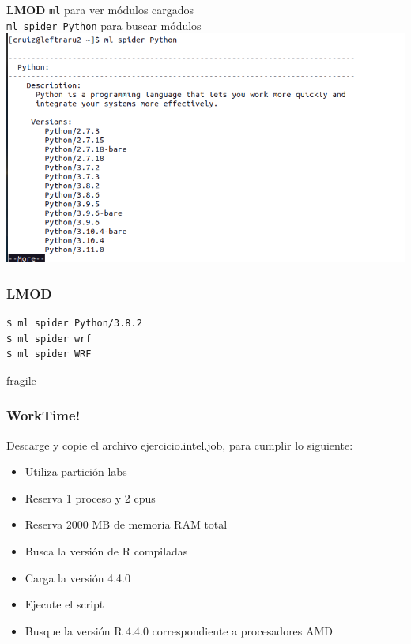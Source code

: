 \documentclass[aspectratio=169,professionalfonts]{beamer}
\begin{document}
\begin{frame}{\textbf{LMOD}}
    \texttt{ml} para ver módulos cargados \\ 
    \texttt{ml spider Python} para buscar módulos\\ 
\centering
    \includegraphics[scale=0.35]{FIGURES/ml_spider_python.png} \\
\end{frame} 

\begin{frame}[fragile]
\frametitle{\textbf{LMOD}}
\begin{verbatim}
$ ml spider Python/3.8.2
$ ml spider wrf
$ ml spider WRF
\end{verbatim}
\end{frame}

\begin{frame}{fragile}
\frametitle{\textbf{WorkTime!}}
Descarge y copie el archivo ejercicio.intel.job, para cumplir lo siguiente:
\begin{itemize}
    \item Utiliza partición labs 
         \vspace{0.5em} 
    \item Reserva 1 proceso y 2 cpus
         \vspace{0.5em} 
    \item Reserva 2000 MB de memoria RAM total   
    \vspace{0.5em} 
     \item Busca la versión de R compiladas
          \vspace{0.5em} 
   \item Carga la versión 4.4.0 
        \vspace{0.5em} 
    \item Ejecute el script 
         \vspace{0.5em} 
    \item Busque la versión R 4.4.0 correspondiente a procesadores AMD 
    
\end{itemize}
    
\end{frame}
\end{document}
